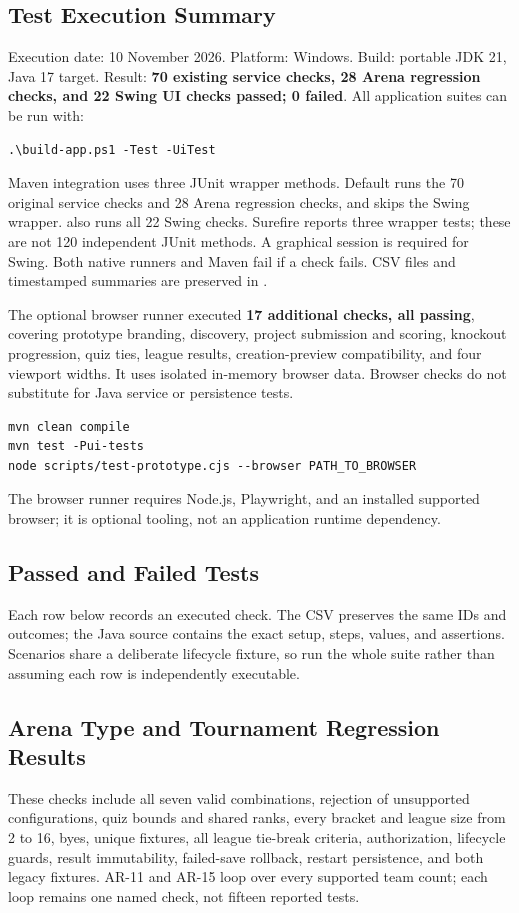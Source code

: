 \documentclass[12pt]{article}
\begin{document}
\subsection{Test Execution Summary}
Execution date: 10 November 2026. Platform: Windows. Build: portable JDK 21, Java 17 target. Result: \textbf{70 existing service checks, 28 Arena regression checks, and 22 Swing UI checks passed; 0 failed}. All application suites can be run with:
\begin{verbatim}
.\build-app.ps1 -Test -UiTest
\end{verbatim}
Maven integration uses three JUnit wrapper methods. Default  runs the 70 original service checks and 28 Arena regression checks, and skips the Swing wrapper.  also runs all 22 Swing checks. Surefire reports three wrapper tests; these are not 120 independent JUnit methods. A graphical session is required for Swing. Both native runners and Maven fail if a check fails. CSV files and timestamped summaries are preserved in .

The optional browser runner executed \textbf{17 additional checks, all passing}, covering prototype branding, discovery, project submission and scoring, knockout progression, quiz ties, league results, creation-preview compatibility, and four viewport widths. It uses isolated in-memory browser data. Browser checks do not substitute for Java service or persistence tests.

\begin{verbatim}
mvn clean compile
mvn test -Pui-tests
node scripts/test-prototype.cjs --browser PATH_TO_BROWSER
\end{verbatim}
The browser runner requires Node.js, Playwright, and an installed supported browser; it is optional tooling, not an application runtime dependency.

\subsection{Passed and Failed Tests}
Each row below records an executed check. The CSV preserves the same IDs and outcomes; the Java source contains the exact setup, steps, values, and assertions. Scenarios share a deliberate lifecycle fixture, so run the whole suite rather than assuming each row is independently executable.

\subsection{Arena Type and Tournament Regression Results}
These checks include all seven valid combinations, rejection of unsupported configurations, quiz bounds and shared ranks, every bracket and league size from 2 to 16, byes, unique fixtures, all league tie-break criteria, authorization, lifecycle guards, result immutability, failed-save rollback, restart persistence, and both legacy fixtures. AR-11 and AR-15 loop over every supported team count; each loop remains one named check, not fifteen reported tests.

\end{document}
